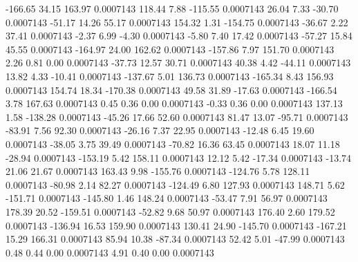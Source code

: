      -166.65       34.15      163.97     0.0007143
      118.44        7.88     -115.55     0.0007143
       26.04        7.33      -30.70     0.0007143
      -51.17       14.26       55.17     0.0007143
      154.32        1.31     -154.75     0.0007143
      -36.67        2.22       37.41     0.0007143
       -2.37        6.99       -4.30     0.0007143
       -5.80        7.40       17.42     0.0007143
      -57.27       15.84       45.55     0.0007143
     -164.97       24.00      162.62     0.0007143
     -157.86        7.97      151.70     0.0007143
        2.26        0.81        0.00     0.0007143
      -37.73       12.57       30.71     0.0007143
       40.38        4.42      -44.11     0.0007143
       13.82        4.33      -10.41     0.0007143
     -137.67        5.01      136.73     0.0007143
     -165.34        8.43      156.93     0.0007143
      154.74       18.34     -170.38     0.0007143
       49.58       31.89      -17.63     0.0007143
     -166.54        3.78      167.63     0.0007143
        0.45        0.36        0.00     0.0007143
       -0.33        0.36        0.00     0.0007143
      137.13        1.58     -138.28     0.0007143
      -45.26       17.66       52.60     0.0007143
       81.47       13.07      -95.71     0.0007143
      -83.91        7.56       92.30     0.0007143
      -26.16        7.37       22.95     0.0007143
      -12.48        6.45       19.60     0.0007143
      -38.05        3.75       39.49     0.0007143
      -70.82       16.36       63.45     0.0007143
       18.07       11.18      -28.94     0.0007143
     -153.19        5.42      158.11     0.0007143
       12.12        5.42      -17.34     0.0007143
      -13.74       21.06       21.67     0.0007143
      163.43        9.98     -155.76     0.0007143
     -124.76        5.78      128.11     0.0007143
      -80.98        2.14       82.27     0.0007143
     -124.49        6.80      127.93     0.0007143
      148.71        5.62     -151.71     0.0007143
     -145.80        1.46      148.24     0.0007143
      -53.47        7.91       56.97     0.0007143
      178.39       20.52     -159.51     0.0007143
      -52.82        9.68       50.97     0.0007143
      176.40        2.60      179.52     0.0007143
     -136.94       16.53      159.90     0.0007143
      130.41       24.90     -145.70     0.0007143
     -167.21       15.29      166.31     0.0007143
       85.94       10.38      -87.34     0.0007143
       52.42        5.01      -47.99     0.0007143
        0.48        0.44        0.00     0.0007143
        4.91        0.40        0.00     0.0007143
